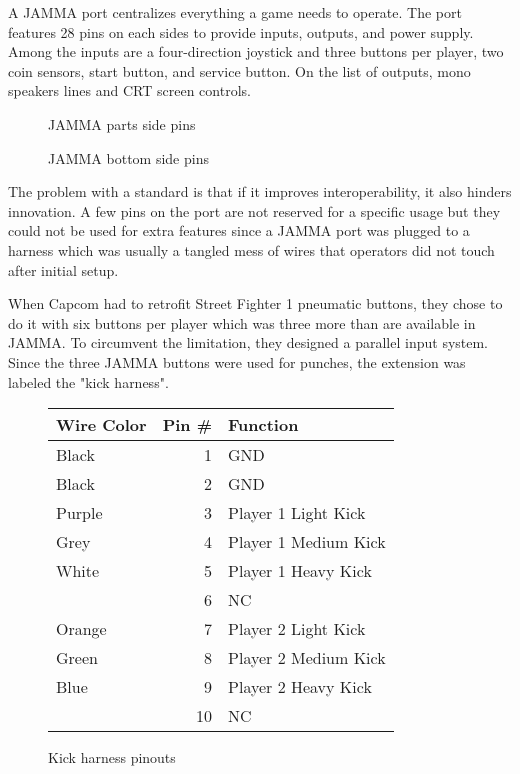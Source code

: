 A JAMMA port centralizes everything a game needs to operate. The port features 28 pins on each sides to provide inputs, outputs, and power supply. Among the inputs are a four-direction joystick and three buttons per player, two coin sensors, start button, and service button. On the list of outputs, mono speakers lines and CRT screen controls.

 \begin{figure}[H]
\caption*{JAMMA parts side pins}
\end{figure}

 \begin{figure}[H]
\caption*{JAMMA bottom side pins}
\end{figure}

The problem with a standard is that if it improves interoperability, it also hinders innovation. A few pins on the port are not reserved for a specific usage but they could not be used for extra features since a JAMMA port was plugged to a harness which was usually a tangled mess of wires that operators did not touch after initial setup.

When Capcom had to retrofit Street Fighter 1 pneumatic buttons, they chose to do it with six buttons per player which was three more than are available in JAMMA. To circumvent the limitation, they designed a parallel input system. Since the three JAMMA buttons were used for punches, the extension was labeled the "kick harness".

\begin{figure}[H]

\begin{tabularx}{\textwidth}{lrX}
  \toprule    
  \textbf{Wire Color } & \textbf{ Pin \#}  & \textbf{Function } \\               
  \toprule   
  Black & 1 & GND \\
  Black & 2 & GND \\
  \toprule   
  Purple & 3 & Player 1 Light Kick \\
  Grey & 4 & Player 1 Medium Kick \\
  White & 5 & Player 1 Heavy Kick \\
  \toprule   
  & 6 & NC \\
  \toprule   
  Orange & 7 & Player 2 Light Kick\\
  Green & 8 & Player 2 Medium Kick\\
  Blue & 9 & Player 2 Heavy Kick\\
  \toprule   
  & 10 & NC \\
  \toprule   
\end{tabularx}
\caption*{Kick harness pinouts}
\end{figure}










